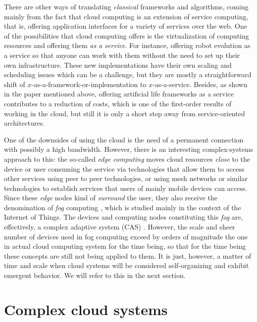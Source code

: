 \documentclass[utf8]{frontiersSCNS} %
\begin{document}
There are other ways of translating {\em classical} frameworks and
algorithms, coming mainly from the fact that cloud computing is an
extension of service computing, that is, offering application
interfaces for a variety of services over the web. One of the possibilities that cloud computing offers
is the virtualization of computing resources and offering them {\em as a
service}. For instance, offering robot evolution as a service
\citep{du2017robot,chen2010robot} so that anyone can work with them without the
need to set up their own infrastructure. These new
implementations have their own scaling and scheduling issues which can
be a challenge, but they are mostly a straightforward shift
of $x$-as-a-framework-or-implementation to $x$-as-a-service. Besides,
as shown in the paper mentioned above, offering artificial life
frameworks as a service contributes to a
reduction of costs, which is one of the first-order results of working
in the cloud, but still it is only a short step away from
service-oriented architectures.


One of the downsides of using the cloud is the need of a permanent connection
with possibly a high bandwidth. However, there is
an interesting complex-systems approach to this: the so-called {\em edge
computing} \citep{shi2016edge} moves cloud resources {\em close} to
the device or user consuming the service via technologies that allow them to access other
services using peer to peer technologies, or using mesh networks or
similar technologies to establish services that users of mainly mobile
devices can access. Since these {\em edge} nodes kind of {\em surround} the
user, they also receive the denomination of {\em fog} computing \citep{luan2015fog}, 
which is studied mainly in the context of the Internet
of Things. The devices and computing nodes constituting this {\em fog}
are, effectively, a complex adaptive system (CAS)
\citep{yan2010application,roca2018tackling}. However, the scale and sheer
number of devices used in fog computing exceed by orders of magnitude
the one in actual cloud computing system for the time being, so that
for the time being these concepts are still not being applied to
them. It is just, however, a matter of time and scale when cloud
systems will be considered self-organizing and exhibit emergent
behavior. We will refer to this in the next section.


\section{Complex cloud systems }
\end{document}
